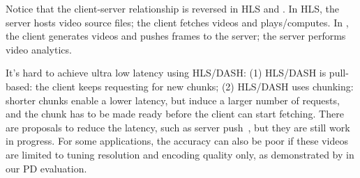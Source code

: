 \documentclass[twocolumn]{article}
\begin{document}
Notice that the client-server relationship is reversed in HLS and \sysname{}. In
HLS, the server hosts video source files; the client fetches videos and
plays/computes. In \sysname{}, the client generates videos and pushes frames to
the server; the server performs video analytics.

\vspace{0.5em}
 It's hard to achieve
ultra low latency using HLS/DASH: (1) HLS/DASH is pull-based: the client keeps
requesting for new chunks; (2) HLS/DASH uses chunking: shorter chunks enable a
lower latency, but induce a larger number of requests, and the chunk has to be
made ready before the client can start fetching. There are proposals to reduce
the latency, such as server push~\cite{wei2014low}, but they are still work in
progress. For some applications, the accuracy can also be poor if these videos
are limited to tuning resolution and encoding quality only, as demonstrated by
in our PD evaluation.


\balance

{\footnotesize 
  }
\end{document}
